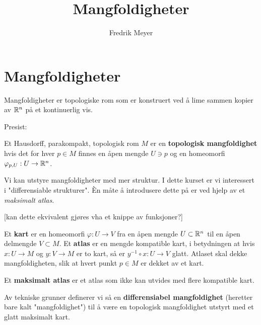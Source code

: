 \documentclass[11pt, english]{article}
\begin{document}
\title{Mangfoldigheter}
\author{Fredrik Meyer}
\maketitle 

\section{Mangfoldigheter}

Mangfoldigheter er topologiske rom som er konstruert ved å lime sammen kopier av $\mathbb{R}^n$ på et kontinuerlig vis.

Presist:

\begin{defi}
Et Hausdorff, parakompakt, topologisk rom $M$ er en \textbf{topologisk mangfoldighet} hvis det for hver $p \in M$ finnes en åpen mengde $U \ni p$ og en homeomorfi $\varphi_{p,U}:U \to \mathbb{R}^n$. 
\end{defi}

Vi kan utstyre mangfoldigheter med mer struktur. I dette kurset er vi interessert i "differensiable strukturer". Èn måte å introdusere dette på er ved hjelp av et \emph{maksimalt atlas}. 

[kan dette ekvivalent gjøres vha et knippe av funksjoner?]

\begin{defi}
Et \textbf{kart} er en homeomorfi $\varphi:U \to V$ fra en åpen mengde $U \subset \mathbb{R}^n$ til en åpen delmengde $V \subset M$. Et \textbf{atlas} er en mengde kompatible kart, i betydningen at hvis $x:U \to M$ og $y:V \to M$ er to kart, så er $y^{-1} \circ x : U \to V$ glatt. Atlaset skal dekke mangfoldigheten, slik at hvert punkt $p \in M$ er dekket av et kart. 

Et \textbf{maksimalt atlas} er et atlas som ikke kan utvides med flere kompatible kart.
\end{defi}

Av tekniske grunner definerer vi så en \textbf{differensiabel mangfoldighet} (heretter bare kalt "mangfoldighet") til å være en topologisk mangfoldighet utstyrt med et glatt maksimalt kart. 
\end{document}
